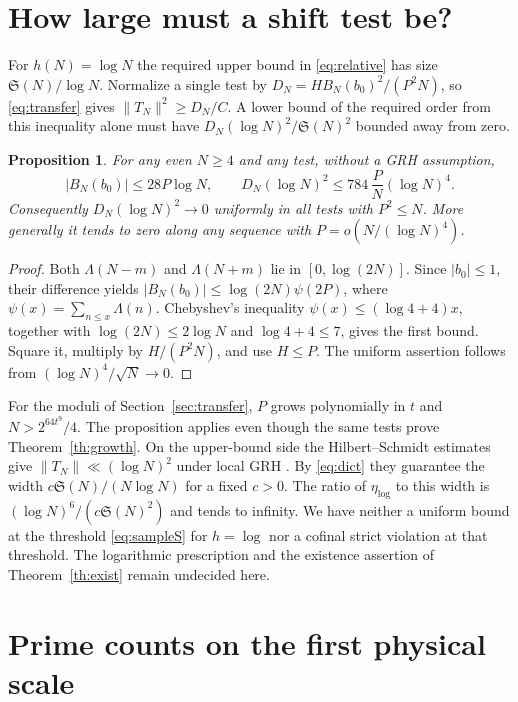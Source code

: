 \documentclass[11pt,a4paper]{article}
\newtheorem{proposition}[theorem]{Proposition}
\newcommand{\SSg}{\mathfrak S}
\begin{document}
\section{How large must a shift test be?}\label{sec:limit}

For $h(N)=\log N$ the required upper bound in \eqref{eq:relative} has size $\SSg(N)/\log N$. Normalize a single test by
$D_N=HB_N(b_0)^2/(P^2N)$, so \eqref{eq:transfer} gives $\|T_N\|^2\ge D_N/C$. A lower bound of the required order from this inequality alone must have $D_N(\log N)^2/\SSg(N)^2$ bounded away from zero.

\begin{proposition}\label{pr:cap}
For any even $N\ge4$ and any test, without a GRH assumption,
\[
 |B_N(b_0)|\le28P\log N,\qquad
 D_N(\log N)^2\le784\,\frac{P}{N}(\log N)^4 .
\]
Consequently $D_N(\log N)^2\to0$ uniformly in all tests with $P^2\le N$. More generally it tends to zero along any sequence with $P=o(N/(\log N)^4)$.
\end{proposition}
\begin{proof}
Both $\Lambda(N-m)$ and $\Lambda(N+m)$ lie in $[0,\log(2N)]$. Since $|b_0|\le1$, their difference yields
$|B_N(b_0)|\le\log(2N)\psi(2P)$, where $\psi(x)=\sum_{n\le x}\Lambda(n)$. Chebyshev's inequality $\psi(x)\le(\log4+4)x$, together with $\log(2N)\le2\log N$ and $\log4+4\le7$, gives the first bound. Square it, multiply by $H/(P^2N)$, and use $H\le P$. The uniform assertion follows from $(\log N)^4/\sqrt N\to0$.
\end{proof}

For the moduli of Section~\ref{sec:transfer}, $P$ grows polynomially in $t$ and $N>2^{64t^9}/4$. The proposition applies even though the same tests prove Theorem~\ref{th:growth}. On the upper-bound side the Hilbert--Schmidt estimates give $\|T_N\|\ll(\log N)^2$ under local GRH \cite[Theorem 6.2]{LL}. By \eqref{eq:dict} they guarantee the width $c\SSg(N)/(N\log N)$ for a fixed $c>0$. The ratio of $\eta_{\log}$ to this width is $(\log N)^6/(c\SSg(N)^2)$ and tends to infinity. We have neither a uniform bound at the threshold \eqref{eq:sampleS} for $h=\log$ nor a cofinal strict violation at that threshold. The logarithmic prescription and the existence assertion of Theorem~\ref{th:exist} remain undecided here.

\section{Prime counts on the first physical scale}\label{sec:sharp}
\end{document}
